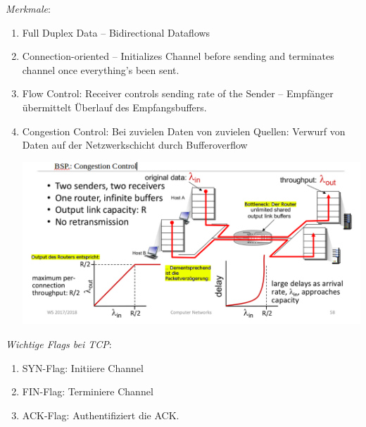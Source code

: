 \documentclass{article}
\begin{document}
    \textit{Merkmale}:
    \begin{enumerate}
        \item Full Duplex Data -- Bidirectional Dataflows
        \item Connection-oriented -- Initializes Channel before sending and terminates channel once everything's been sent.
        \item Flow Control: Receiver controls sending rate of the Sender -- Empfänger übermittelt Überlauf des Empfangsbuffers.
        \item Congestion Control: Bei zuvielen Daten von zuvielen Quellen: Verwurf von Daten auf der Netzwerkschicht durch Bufferoverflow
        \begin{center}
            \includegraphics[width=\textwidth]{CongestionControl.png}
    \end{center}
    \end{enumerate}
    
    \textit{Wichtige Flags bei TCP}:
    \begin{enumerate}
        \item SYN-Flag: Initiiere Channel
        \item FIN-Flag: Terminiere Channel
        \item ACK-Flag: Authentifiziert die ACK.
    \end{enumerate}
    
\end{document}
